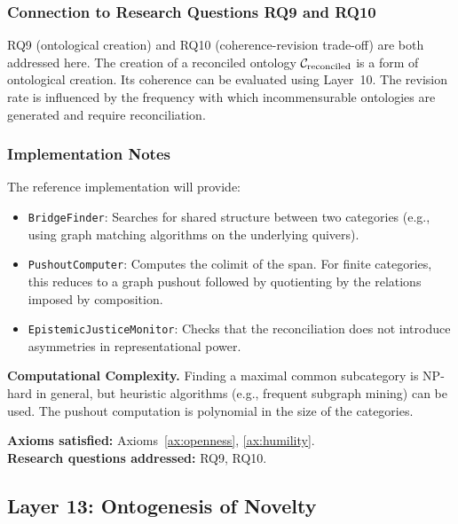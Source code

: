 \subsubsection{Connection to Research Questions RQ9 and RQ10}
RQ9 (ontological creation) and RQ10 (coherence-revision trade-off) are both addressed here. The creation of a reconciled ontology $\mathcal{C}_{\text{reconciled}}$ is a form of ontological creation. Its coherence can be evaluated using Layer~10. The revision rate is influenced by the frequency with which incommensurable ontologies are generated and require reconciliation.

\subsubsection{Implementation Notes}
The reference implementation will provide:
\begin{itemize}
    \item \texttt{BridgeFinder}: Searches for shared structure between two categories (e.g., using graph matching algorithms on the underlying quivers).
    \item \texttt{PushoutComputer}: Computes the colimit of the span. For finite categories, this reduces to a graph pushout followed by quotienting by the relations imposed by composition.
    \item \texttt{EpistemicJusticeMonitor}: Checks that the reconciliation does not introduce asymmetries in representational power.
\end{itemize}

\textbf{Computational Complexity.} Finding a maximal common subcategory is NP-hard in general, but heuristic algorithms (e.g., frequent subgraph mining) can be used. The pushout computation is polynomial in the size of the categories.

\textbf{Axioms satisfied:} Axioms~\ref{ax:openness}, \ref{ax:humility}. \\
\textbf{Research questions addressed:} RQ9, RQ10.

\subsection{Layer 13: Ontogenesis of Novelty}
\label{subsec:layer13}


